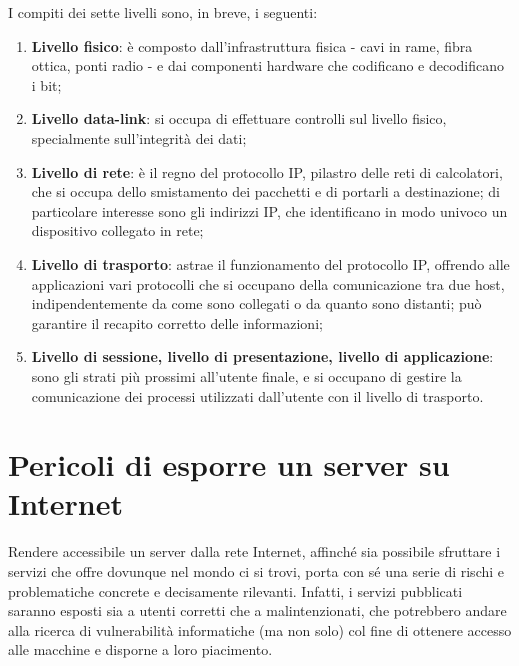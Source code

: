 I compiti dei sette livelli sono, in breve, i seguenti:
\begin{enumerate}
    \item \textbf{Livello fisico}: è composto dall'infrastruttura fisica - cavi in rame, fibra ottica, ponti radio - e dai componenti hardware che codificano e decodificano i bit;
    \item \textbf{Livello data-link}: si occupa di effettuare controlli sul livello fisico, specialmente sull'integrità dei dati;
    \item \textbf{Livello di rete}: è il regno del protocollo IP, pilastro delle reti di calcolatori, che si occupa dello smistamento dei pacchetti e di portarli a destinazione; di particolare interesse sono gli indirizzi IP, che identificano in modo univoco un dispositivo collegato in rete;
    \item \textbf{Livello di trasporto}: astrae il funzionamento del protocollo IP, offrendo alle applicazioni vari protocolli che si occupano della comunicazione tra due host, indipendentemente da come sono collegati o da quanto sono distanti; può garantire il recapito corretto delle informazioni;
    \item \textbf{Livello di sessione, livello di presentazione, livello di applicazione}: sono gli strati più prossimi all'utente finale, e si occupano di gestire la comunicazione dei processi utilizzati dall'utente con il livello di trasporto.
\end{enumerate}

\section{Pericoli di esporre un server su Internet}
Rendere accessibile un server dalla rete Internet, affinché sia possibile sfruttare i servizi che offre dovunque nel mondo ci si trovi, porta con sé una serie di rischi e problematiche concrete e decisamente rilevanti.
Infatti, i servizi pubblicati saranno esposti sia a utenti corretti che a malintenzionati, che potrebbero andare alla ricerca di vulnerabilità informatiche (ma non solo) col fine di ottenere accesso alle macchine e disporne a loro piacimento.


